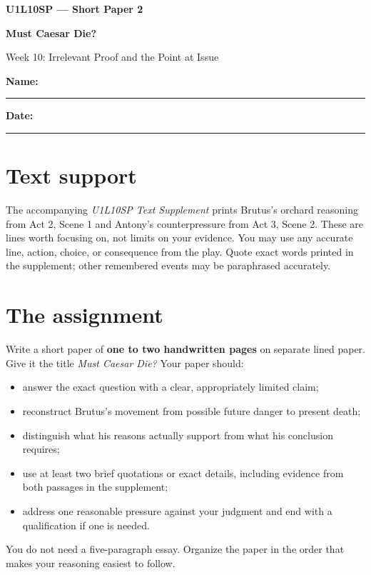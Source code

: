\documentclass[11pt]{article}
\newcommand{\smallblank}{\rule{0.43\linewidth}{0.4pt}}
\begin{document}
\begin{center}
{\Large\bfseries U1L10SP --- Short Paper 2}\par
{\LARGE\bfseries Must Caesar Die?}\par
{\large Week 10: Irrelevant Proof and the Point at Issue}
\end{center}
\noindent\textbf{Name:} \smallblank\hfill
\textbf{Date:} \rule{1.35in}{0.4pt}

\begingroup\small
\vspace{0.25em}

\section*{Text support}
The accompanying \textit{U1L10SP Text Supplement} prints Brutus's orchard reasoning from Act 2, Scene 1 and Antony's counterpressure from Act 3, Scene 2. These are lines worth focusing on, not limits on your evidence. You may use any accurate line, action, choice, or consequence from the play. Quote exact words printed in the supplement; other remembered events may be paraphrased accurately.

\section*{The assignment}
Write a short paper of \textbf{one to two handwritten pages} on separate lined paper. Give it the title \textit{Must Caesar Die?} Your paper should:
\begin{itemize}
\item answer the exact question with a clear, appropriately limited claim;
\item reconstruct Brutus's movement from possible future danger to present death;
\item distinguish what his reasons actually support from what his conclusion requires;
\item use at least two brief quotations or exact details, including evidence from both passages in the supplement;
\item address one reasonable pressure against your judgment and end with a qualification if one is needed.
\end{itemize}
You do not need a five-paragraph essay. Organize the paper in the order that makes your reasoning easiest to follow.
\end{document}
